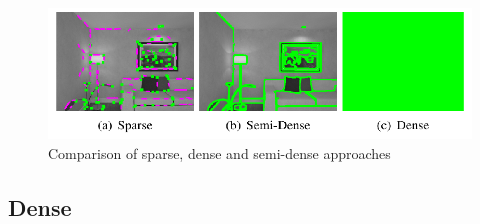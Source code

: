 \documentclass[11pt,a4paper,titlepage,oneside]{report}
\begin{document}
\begin{figure}[H]
  \begin{center}
		\includegraphics[width=1.0\textwidth]{img/sparse_dense.png}
  \end{center}
	\caption{Comparison of sparse, dense and semi-dense approaches \cite{svo}}\label{fig:sparse_dense}
\end{figure}

\subsection{Dense}
\end{document}
